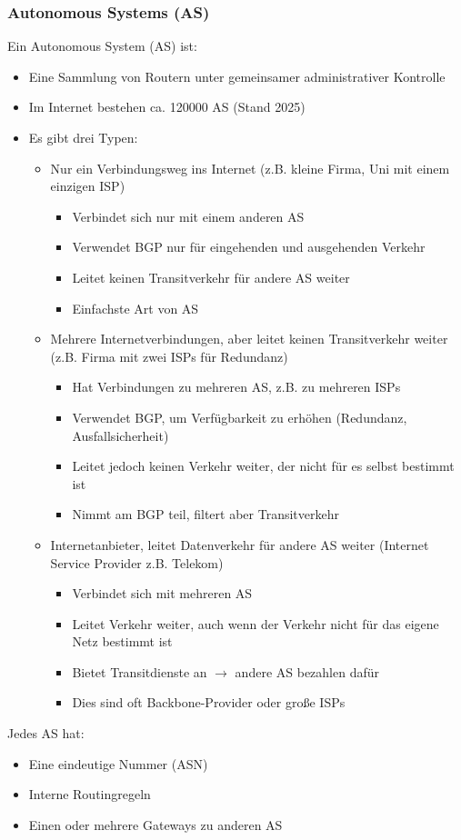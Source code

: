 \subsubsection*{Autonomous Systems (AS)}
Ein Autonomous System (AS) ist:
\begin{itemize}
    \item Eine Sammlung von Routern unter gemeinsamer administrativer Kontrolle
    \item Im Internet bestehen ca. 120000 AS (Stand 2025)
    \item Es gibt drei Typen:
    \begin{itemize}
        \item {} Nur ein Verbindungsweg ins Internet (z.B. kleine Firma, Uni mit einem einzigen ISP)
        \begin{itemize}
            \item Verbindet sich nur mit einem anderen AS
            \item Verwendet BGP nur für eingehenden und ausgehenden Verkehr
            \item Leitet keinen Transitverkehr für andere AS weiter
            \item Einfachste Art von AS
        \end{itemize}
        \item {} Mehrere Internetverbindungen, aber leitet keinen Transitverkehr weiter (z.B. Firma mit zwei ISPs für Redundanz)
        \begin{itemize}
            \item Hat Verbindungen zu mehreren AS, z.B. zu mehreren ISPs
            \item Verwendet BGP, um Verfügbarkeit zu erhöhen (Redundanz, Ausfallsicherheit)
            \item Leitet jedoch keinen Verkehr weiter, der nicht für es selbst bestimmt ist
            \item Nimmt am BGP teil, filtert aber Transitverkehr
        \end{itemize}
        \item {} Internetanbieter, leitet Datenverkehr für andere AS weiter (Internet Service Provider z.B. Telekom)
        \begin{itemize}
            \item Verbindet sich mit mehreren AS
            \item Leitet Verkehr weiter, auch wenn der Verkehr nicht für das eigene Netz bestimmt ist
            \item Bietet Transitdienste an $\rightarrow$ andere AS bezahlen dafür
            \item Dies sind oft Backbone-Provider oder große ISPs
        \end{itemize}
    \end{itemize}
\end{itemize}
Jedes AS hat:
\begin{itemize}
    \item Eine eindeutige Nummer (ASN)
    \item Interne Routingregeln
    \item Einen oder mehrere Gateways zu anderen AS
\end{itemize}
